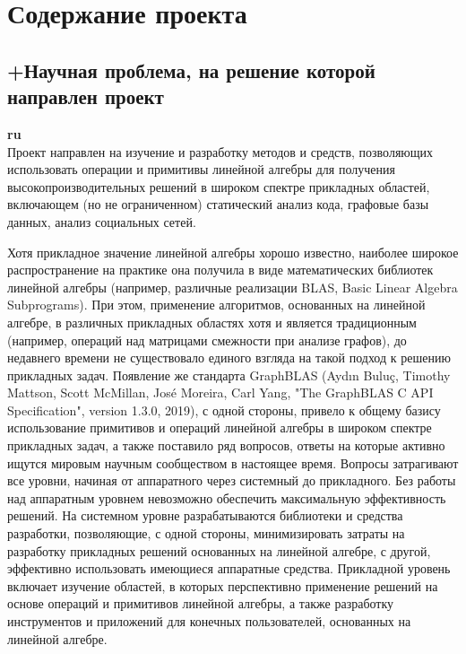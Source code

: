 \documentclass[12pt]{article}  %
\theoremstyle{remark}
\begin{document}
\section{Содержание проекта}

\subsection{+Научная проблема, на решение которой направлен проект}

\textbf{ru}\\

Проект направлен на изучение и разработку методов и средств, позволяющих использовать операции и примитивы линейной алгебры для получения высокопроизводительных решений в широком спектре прикладных областей, включающем (но не ограниченном) статический анализ кода, графовые базы данных, анализ социальных сетей.

Хотя прикладное значение линейной алгебры хорошо известно, наиболее широкое распространение на практике она получила в виде математических библиотек линейной алгебры (например, различные реализации BLAS, Basic Linear Algebra Subprograms). При этом, применение алгоритмов, основанных на линейной алгебре, в различных прикладных областях хотя и является традиционным (например, операций над матрицами смежности при анализе графов), до недавнего времени не существовало единого взгляда на такой подход к решению прикладных задач. Появление же стандарта GraphBLAS (Aydın Bulu\c{c}, Timothy Mattson, Scott McMillan, Jos\'{e} Moreira, Carl Yang, "The GraphBLAS C API Specification", version 1.3.0, 2019), с одной стороны, привело к общему базису использование примитивов и операций линейной алгебры в широком спектре прикладных задач, а также поставило ряд вопросов, ответы на которые активно ищутся мировым научным сообществом в настоящее время. Вопросы затрагивают все уровни, начиная от аппаратного через системный до прикладного. Без работы над аппаратным уровнем невозможно обеспечить максимальную эффективность решений. На системном уровне разрабатываются библиотеки и средства разработки, позволяющие, с одной стороны, минимизировать затраты на разработку прикладных решений основанных на линейной алгебре, с другой, эффективно использовать имеющиеся аппаратные средства. Прикладной уровень включает изучение областей, в которых перспективно применение решений на основе операций и примитивов линейной алгебры, а также разработку инструментов и приложений для конечных пользователей, основанных на линейной алгебре.
\end{document}
